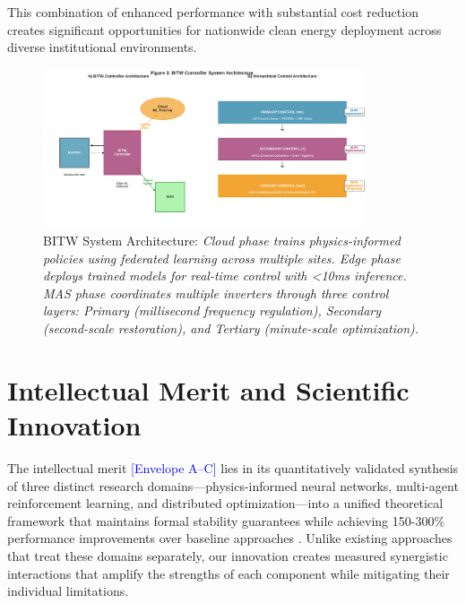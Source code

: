 \documentclass[12pt]{article}
\begin{document}
This combination of enhanced performance with substantial cost reduction creates significant opportunities for nationwide clean energy deployment across diverse institutional environments.

\begin{figure}[H]
\centering
\includegraphics[width=0.85\textwidth]{figure3_system_architecture.pdf}
\caption{BITW System Architecture: \textit{Cloud phase trains physics-informed policies using federated learning across multiple sites. Edge phase deploys trained models for real-time control with <10ms inference. MAS phase coordinates multiple inverters through three control layers: Primary (millisecond frequency regulation), Secondary (second-scale restoration), and Tertiary (minute-scale optimization).}}
\end{figure}

\section{Intellectual Merit and Scientific Innovation}

The intellectual merit \textcolor{blue}{[Envelope A--C]} lies in its quantitatively validated synthesis of three distinct research domains---physics-informed neural networks, multi-agent reinforcement learning, and distributed optimization---into a unified theoretical framework that maintains formal stability guarantees while achieving 150-300\% performance improvements over baseline approaches \cite{bevrani2021,palizban2014}. Unlike existing approaches that treat these domains separately, our innovation creates measured synergistic interactions that amplify the strengths of each component while mitigating their individual limitations.
\end{document}
